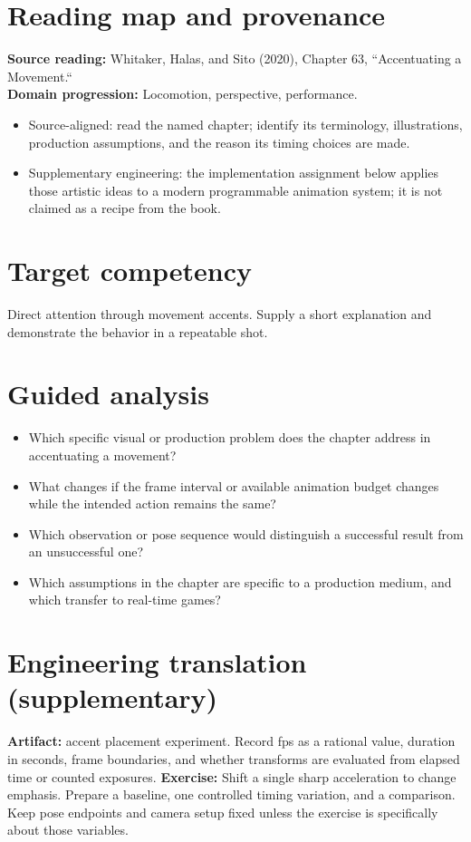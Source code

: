 \documentclass[10pt,letterpaper]{article}
\begin{document}
\makedoctitle
\makedocsummary

\section{Reading map and provenance}
\textbf{Source reading:} Whitaker, Halas, and Sito (2020), Chapter 63, ``Accentuating a Movement.``\\
\textbf{Domain progression:} Locomotion, perspective, performance.
\begin{itemize}
\item Source-aligned: read the named chapter; identify its terminology, illustrations, production assumptions, and the reason its timing choices are made.
\item Supplementary engineering: the implementation assignment below applies those artistic ideas to a modern programmable animation system; it is not claimed as a recipe from the book.
\end{itemize}
\section{Target competency}
Direct attention through movement accents. Supply a short explanation and demonstrate the behavior in a repeatable shot.
\section{Guided analysis}
\begin{itemize}
\item Which specific visual or production problem does the chapter address in accentuating a movement?
\item What changes if the frame interval or available animation budget changes while the intended action remains the same?
\item Which observation or pose sequence would distinguish a successful result from an unsuccessful one?
\item Which assumptions in the chapter are specific to a production medium, and which transfer to real-time games?
\end{itemize}
\section{Engineering translation (supplementary)}
\textbf{Artifact:} accent placement experiment. Record fps as a rational value, duration in seconds, frame boundaries, and whether transforms are evaluated from elapsed time or counted exposures.
\textbf{Exercise:} Shift a single sharp acceleration to change emphasis. Prepare a baseline, one controlled timing variation, and a comparison. Keep pose endpoints and camera setup fixed unless the exercise is specifically about those variables.
\end{document}
